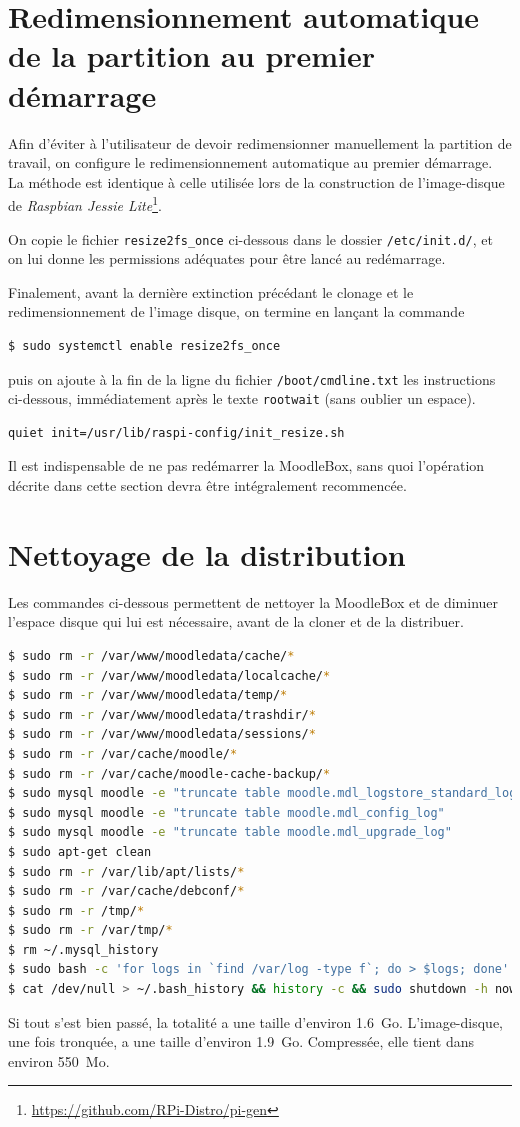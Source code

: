\documentclass[11pt]{article}
\begin{document}
\section{Redimensionnement automatique de la partition au premier démarrage}

Afin d'éviter à l'utilisateur de devoir redimensionner manuellement la partition de travail, on configure le redimensionnement automatique au premier démarrage. La méthode est identique à celle utilisée lors de la construction de l'image-disque de \emph{Raspbian Jessie Lite}\footnote{\url{https://github.com/RPi-Distro/pi-gen}}.

On copie le fichier \lstinline{resize2fs_once} ci-dessous dans le dossier \lstinline{/etc/init.d/}, et on lui donne les permissions adéquates pour être lancé au redémarrage.


Finalement, avant la dernière extinction précédant le clonage et le redimensionnement de l'image disque, on termine en lançant la commande
\begin{lstlisting}[language=bash]
$ sudo systemctl enable resize2fs_once
\end{lstlisting}
puis on ajoute à la fin de la ligne du fichier \lstinline{/boot/cmdline.txt} les instructions ci-dessous, immédiatement après le texte \lstinline{rootwait} (sans oublier un espace).
\begin{lstlisting}[language=bash]
quiet init=/usr/lib/raspi-config/init_resize.sh
\end{lstlisting}

Il est indispensable de ne pas redémarrer la MoodleBox, sans quoi l'opération décrite dans cette section devra être intégralement recommencée.

\section{Nettoyage de la distribution}

Les commandes ci-dessous permettent de nettoyer la MoodleBox et de diminuer l'espace disque qui lui est nécessaire, avant de la cloner et de la distribuer.

\begin{lstlisting}[language=bash]
$ sudo rm -r /var/www/moodledata/cache/*
$ sudo rm -r /var/www/moodledata/localcache/*
$ sudo rm -r /var/www/moodledata/temp/*
$ sudo rm -r /var/www/moodledata/trashdir/*
$ sudo rm -r /var/www/moodledata/sessions/*
$ sudo rm -r /var/cache/moodle/*
$ sudo rm -r /var/cache/moodle-cache-backup/*
$ sudo mysql moodle -e "truncate table moodle.mdl_logstore_standard_log"
$ sudo mysql moodle -e "truncate table moodle.mdl_config_log"
$ sudo mysql moodle -e "truncate table moodle.mdl_upgrade_log"
$ sudo apt-get clean
$ sudo rm -r /var/lib/apt/lists/*
$ sudo rm -r /var/cache/debconf/*
$ sudo rm -r /tmp/*
$ sudo rm -r /var/tmp/*
$ rm ~/.mysql_history
$ sudo bash -c 'for logs in `find /var/log -type f`; do > $logs; done'
$ cat /dev/null > ~/.bash_history && history -c && sudo shutdown -h now
\end{lstlisting}

Si tout s'est bien passé, la totalité a une taille d'environ 1.6~Go. L'image-disque, une fois tronquée, a une taille d'environ 1.9~Go. Compressée, elle tient dans environ 550~Mo.
\end{document}
